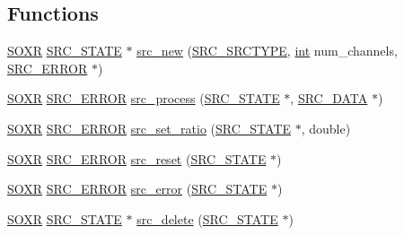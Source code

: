 \subsection*{Functions}
\begin{DoxyCompactItemize}
\item 
\hyperlink{soxr_8h_a9c39f225365ddf49e46ae9e6ae9b990a}{S\+O\+XR} \hyperlink{lsr_8c_af3b690745d177a40cb1ba01f5804378b}{S\+R\+C\+\_\+\+S\+T\+A\+TE} $\ast$ \hyperlink{soxr-lsr_8h_ad41b3ea118f02c5874cac595e74ef4d7}{src\+\_\+new} (\hyperlink{soxr-lsr_8h_a2e2a328e11ac7ce361f7e02d854a172f}{S\+R\+C\+\_\+\+S\+R\+C\+T\+Y\+PE}, \hyperlink{xmltok_8h_a5a0d4a5641ce434f1d23533f2b2e6653}{int} num\+\_\+channels, \hyperlink{soxr-lsr_8h_a430d922cd937a18ab0bce9f817baecfe}{S\+R\+C\+\_\+\+E\+R\+R\+OR} $\ast$)
\item 
\hyperlink{soxr_8h_a9c39f225365ddf49e46ae9e6ae9b990a}{S\+O\+XR} \hyperlink{soxr-lsr_8h_a430d922cd937a18ab0bce9f817baecfe}{S\+R\+C\+\_\+\+E\+R\+R\+OR} \hyperlink{soxr-lsr_8h_a16a2aafa39afbb72490989434efb8739}{src\+\_\+process} (\hyperlink{lsr_8c_af3b690745d177a40cb1ba01f5804378b}{S\+R\+C\+\_\+\+S\+T\+A\+TE} $\ast$, \hyperlink{struct_s_r_c___d_a_t_a}{S\+R\+C\+\_\+\+D\+A\+TA} $\ast$)
\item 
\hyperlink{soxr_8h_a9c39f225365ddf49e46ae9e6ae9b990a}{S\+O\+XR} \hyperlink{soxr-lsr_8h_a430d922cd937a18ab0bce9f817baecfe}{S\+R\+C\+\_\+\+E\+R\+R\+OR} \hyperlink{soxr-lsr_8h_aa69c48b2934ce7c27b750a3031029def}{src\+\_\+set\+\_\+ratio} (\hyperlink{lsr_8c_af3b690745d177a40cb1ba01f5804378b}{S\+R\+C\+\_\+\+S\+T\+A\+TE} $\ast$, double)
\item 
\hyperlink{soxr_8h_a9c39f225365ddf49e46ae9e6ae9b990a}{S\+O\+XR} \hyperlink{soxr-lsr_8h_a430d922cd937a18ab0bce9f817baecfe}{S\+R\+C\+\_\+\+E\+R\+R\+OR} \hyperlink{soxr-lsr_8h_a3d0a1f677a151525191addd7833d100e}{src\+\_\+reset} (\hyperlink{lsr_8c_af3b690745d177a40cb1ba01f5804378b}{S\+R\+C\+\_\+\+S\+T\+A\+TE} $\ast$)
\item 
\hyperlink{soxr_8h_a9c39f225365ddf49e46ae9e6ae9b990a}{S\+O\+XR} \hyperlink{soxr-lsr_8h_a430d922cd937a18ab0bce9f817baecfe}{S\+R\+C\+\_\+\+E\+R\+R\+OR} \hyperlink{soxr-lsr_8h_a79eef49806cb7ec0a07bdac92234a073}{src\+\_\+error} (\hyperlink{lsr_8c_af3b690745d177a40cb1ba01f5804378b}{S\+R\+C\+\_\+\+S\+T\+A\+TE} $\ast$)
\item 
\hyperlink{soxr_8h_a9c39f225365ddf49e46ae9e6ae9b990a}{S\+O\+XR} \hyperlink{lsr_8c_af3b690745d177a40cb1ba01f5804378b}{S\+R\+C\+\_\+\+S\+T\+A\+TE} $\ast$ \hyperlink{soxr-lsr_8h_af9c733a4d1f8bf00ea757058e48d7930}{src\+\_\+delete} (\hyperlink{lsr_8c_af3b690745d177a40cb1ba01f5804378b}{S\+R\+C\+\_\+\+S\+T\+A\+TE} $\ast$)

\end{DoxyCompactItemize}
